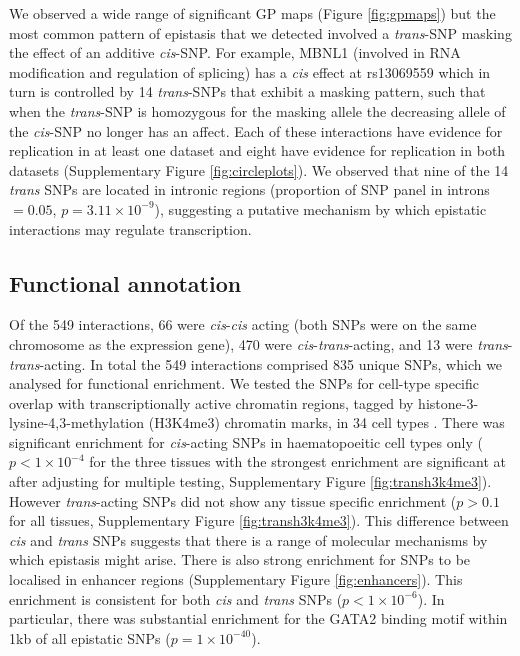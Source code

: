 \documentclass{article}
\begin{document}
We observed a wide range of significant GP maps (Figure \ref{fig:gpmaps}) but the most common pattern of epistasis that we detected involved a \emph{trans}-SNP masking the effect of an additive \emph{cis}-SNP. For example, MBNL1 (involved in RNA modification and regulation of splicing) has a \emph{cis} effect at rs13069559 which in turn is controlled by 14 \emph{trans}-SNPs that exhibit a masking pattern, such that when the \emph{trans}-SNP is homozygous for the masking allele the decreasing allele of the \emph{cis}-SNP no longer has an affect. Each of these interactions have evidence for replication in at least one dataset and eight have evidence for replication in both datasets (Supplementary Figure \ref{fig:circleplots}). We observed that nine of the 14 \emph{trans} SNPs are located in intronic regions (proportion of SNP panel in introns $= 0.05$, $p = 3.11 \times 10^{-9}$), suggesting a putative mechanism by which epistatic interactions may regulate transcription.


\subsection{Functional annotation}
Of the 549 interactions, 66 were \emph{cis}-\emph{cis} acting (both SNPs were on the same chromosome as the expression gene), 470 were \emph{cis}-\emph{trans}-acting, and 13 were \emph{trans}-\emph{trans}-acting. In total the 549 interactions comprised 835 unique SNPs, which we analysed for functional enrichment. We tested the SNPs for cell-type specific overlap with transcriptionally active chromatin regions, tagged by histone-3-lysine-4,3-methylation (H3K4me3) chromatin marks, in 34 cell types \cite{Trynka2013}. There was significant enrichment for \emph{cis}-acting SNPs in haematopoeitic cell types only ($p < 1 \times 10^{-4}$ for the three tissues with the strongest enrichment are significant at after adjusting for multiple testing, Supplementary Figure \ref{fig:transh3k4me3}). However \emph{trans}-acting SNPs did not show any tissue specific enrichment ($p > 0.1$ for all tissues, Supplementary Figure \ref{fig:transh3k4me3}). This difference between \emph{cis} and \emph{trans} SNPs suggests that there is a range of molecular mechanisms by which epistasis might arise. There is also strong enrichment for SNPs to be localised in enhancer regions \cite{Ward2012a} (Supplementary Figure \ref{fig:enhancers}). This enrichment is consistent for both \emph{cis} and \emph{trans} SNPs ($p < 1 \times 10^{-6}$). In particular, there was substantial enrichment for the GATA2 binding motif within 1kb of all epistatic SNPs ($p = 1 \times 10^{-40}$).
\end{document}
